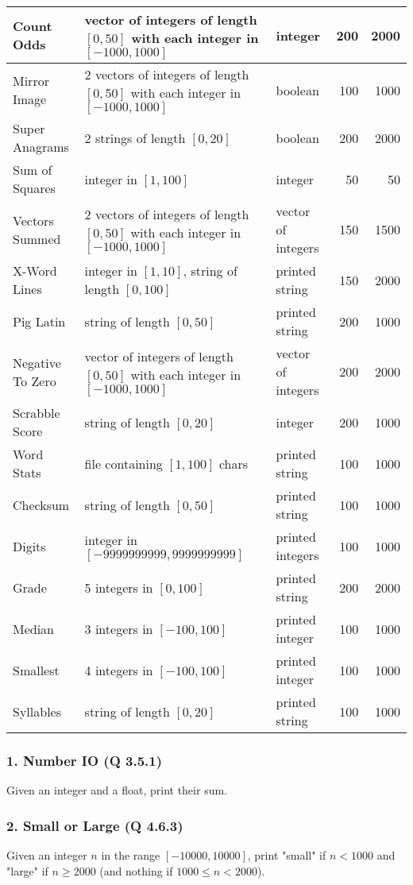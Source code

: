 \documentclass{sig-alternate}
\begin{document}
\begin{table*}[t]
\begin{tabular}{|l | >{\raggedright}p{7.4cm} l rr|}
\hline
Count Odds & vector of integers of length $[0,50]$ with each integer in $[-1000, 1000]$ & integer & 200 & 2000 \\
\hline
Mirror Image & 2 vectors of integers of length $[0,50]$ with each integer in $[-1000, 1000]$ & boolean & 100 & 1000 \\
\hline
Super Anagrams & 2 strings of length $[0, 20]$ & boolean & 200 & 2000 \\
\hline
Sum of Squares & integer in $[1, 100]$ & integer & 50 & 50 \\
\hline
Vectors Summed & 2 vectors of integers of length $[0,50]$ with each integer in $[-1000, 1000]$ & vector of integers & 150 & 1500 \\
\hline
X-Word Lines & integer in $[1, 10]$, string of length $[0, 100]$ & printed string & 150 & 2000 \\
\hline
Pig Latin & string of length $[0, 50]$ & printed string & 200 & 1000 \\
\hline
Negative To Zero & vector of integers of length $[0,50]$ with each integer in $[-1000, 1000]$ & vector of integers & 200 & 2000 \\
\hline
Scrabble Score & string of length $[0, 20]$ & integer & 200 & 1000 \\
\hline
Word Stats & file containing $[1, 100]$ chars & printed string & 100 & 1000 \\
\hline
Checksum & string of length $[0, 50]$ & printed string & 100 & 1000 \\
\hline
Digits & integer in $[-9999999999, 9999999999]$ & printed integers & 100 & 1000 \\
\hline
Grade & 5 integers in $[0, 100]$ & printed string & 200 & 2000 \\
\hline
Median & 3 integers in $[-100, 100]$ & printed integer & 100 & 1000 \\
\hline
Smallest & 4 integers in $[-100, 100]$ & printed integer & 100 & 1000 \\
\hline
Syllables & string of length $[0, 20]$ & printed string & 100 & 1000\\
\hline
\end{tabular}
\end{table*}

\subsubsection*{1. Number IO (Q 3.5.1)}
Given an integer and a float, print their sum.

\subsubsection*{2. Small or Large (Q 4.6.3)}
Given an integer $n$ in the range $[-10000, 10000]$, print "small" if $n < 1000$ and "large" if $n \ge 2000$ (and nothing if $1000 \le n < 2000$).
\end{document}
